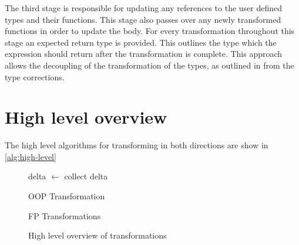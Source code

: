 \documentclass[ oneside,%
                    author={James Elgar},
                    degree={MEng},
                     title={Bidirectional transformer between functional and \\ object-oriented programming in Rust},
                  subtitle={}]{dissertation}
\begin{document}
The third stage is responsible for updating any references to the user defined types and their functions. This stage also passes over any newly transformed functions in order to update the body. For every transformation throughout this stage an expected return type is provided. This outlines the type which the expression should return after the transformation is complete. This approach allows the decoupling of the transformation of the types, as outlined in \cite{food} from the type corrections.

\section{High level overview}

The high level algorithms for transforming in both directions are show in \autoref{alg:high-level}

\begin{figure}
\begin{minipage}{0.46\textwidth}
    \begin{algorithm}[H]
    delta $\leftarrow$ collect delta \\
    \caption{OOP Transformation}
    \label{alg:high-level-oop}
    \end{algorithm}
\end{minipage}
\hfill
\begin{minipage}{0.46\textwidth}
    \begin{algorithm}[H]
    \caption{FP Transformations}
    \label{alg:high-level-fp}
    \end{algorithm}
\end{minipage}
\caption{High level overview of transformations}
\label{alg:high-level}
\end{figure}
\end{document}
